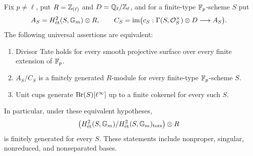 \begin{theorem}
\label{thm:B-all-bases-Brauer-units}
Fix \(p\ne\ell\), put \(R=\mathbb Z_{(\ell)}\) and
\(D=\mathbb Q_\ell/\mathbb Z_\ell\), and for a finite-type
\(\mathbb F_p\)-scheme \(S\) put
\[
 A_S=H^2_{\mathrm{\acute et}}(S,{\mathbb G_m})\otimes R,
 \qquad C_S=\operatorname{im}
       \bigl(c_S:\Gamma(S,\mathcal O_S^\times)\otimes D
                         \longrightarrow A_S\bigr).
\]
The following universal assertions are equivalent:
\begin{enumerate}[label=(\roman*)]
\item Divisor Tate holds for every smooth projective surface
      over every finite extension of \(\mathbb F_p\).
\item \(A_S/C_S\) is a finitely generated \(R\)-module
      for every finite-type \(\mathbb F_p\)-scheme \(S\).
\item Unit cups generate \(\operatorname{Br}(S)[\ell^\infty]\) up
      to a finite cokernel for every such \(S\).
\end{enumerate}
In particular, under these equivalent hypotheses,
\[
 \bigl(H^2_{\mathrm{\acute et}}(S,{\mathbb G_m})/H^2_{\mathrm{\acute et}}(S,{\mathbb G_m})_{\rm tors}\bigr)
                  \otimes R
\]
is finitely generated for every \(S\).  These statements
include nonproper, singular, nonreduced, and nonseparated bases.
\end{theorem}
